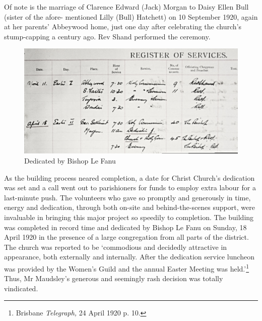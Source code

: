 Of note is the marriage of Clarence Edward (Jack) Morgan to Daisy Ellen Bull (sister of the afore- mentioned Lilly (Bull) Hatchett) on 10 September 1920, again at her parents' Abbeywood home, just one day after celebrating the church's stump-capping a century ago. Rev Shand performed the ceremony.









\begin{figure}[!htb]
\begin{center}
\includegraphics[width=1.\textwidth,center]{../images/dedicationByBishopLeFanu.jpg}
\caption{Dedicated by Bishop Le Fanu}
\end{center}
\end{figure}




As the building process neared completion, a date for Christ Church's dedication was set and a call went out to parishioners for funds to employ extra labour for a last-minute push. The volunteers who gave so promptly and generously in time, energy and dedication, through both on-site and behind-the-scenes support, were invaluable in bringing this major project so speedily to completion. The building was completed in record time and dedicated by Bishop Le Fanu on Sunday, 18 April 1920 in the presence of a large congregation from all parts of the district. The church was reported to be `commodious and decidedly attractive in appearance, both externally and internally. After the dedication service luncheon was provided by the Women's Guild and the annual Easter Meeting was held.'\footnote{Brisbane \emph{Telegraph,} 24 April 1920 p. 10.} Thus, Mr Maudsley's generous and seemingly rash decision was totally vindicated.








